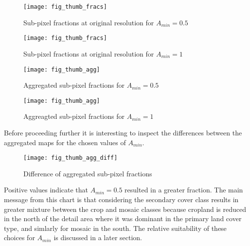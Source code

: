 \begin{figure} 
\begin{center}
  

\texttt{[image: fig\_thumb\_fracs]}
\end{center} 
\caption{Sub-pixel fractions at original resolution for $A_{min}=0.5$}
\label{fig:thumb_fracs}
\end{figure} 

\begin{figure} 
\begin{center}
  

\texttt{[image: fig\_thumb\_fracs]}
\end{center} 
\caption{Sub-pixel fractions at original resolution for $A_{min}=1$}
\label{fig:thumb_fracs}
\end{figure} 


\begin{figure} 
\begin{center}
  

\texttt{[image: fig\_thumb\_agg]}
\end{center} 
\caption{Aggregated sub-pixel fractions for $A_{min}=0.5$}
\label{fig:thumb_agg}
\end{figure} 

\begin{figure} 
\begin{center}
  

\texttt{[image: fig\_thumb\_agg]}
\end{center} 
\caption{Aggreagted sub-pixel fractions for $A_{min}=1$}
\label{fig:thumb_fracs}
\end{figure} 


Before proceeding further it is interesting to inspect the differences
between the aggregated maps for the chosen values of $A_{min}$.


\begin{figure} 
\begin{center}
  

\texttt{[image: fig\_thumb\_agg\_diff]}
\end{center} 
\caption{ Difference of aggregated sub-pixel fractions}
\label{fig:thumb_agg_diff}
\end{figure} 

Positive values indicate that $A_{min} = 0.5$ resulted in a greater
fraction.  The main message from this chart is that considering the
secondary cover class results in greater mixture between the crop and
mosaic classes because cropland is reduced in the north of the detail
area where it was dominant in the primary land cover type, and
simlarly for mosaic in the south.  The relative suitability of these
choices for $A_{min}$ is discussed in a later section. 

